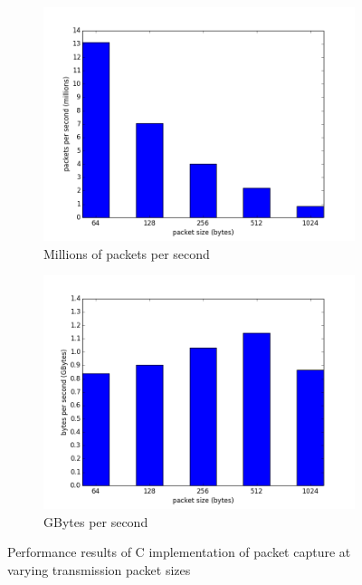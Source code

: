 \documentclass[final_report.tex]{subfiles}
\begin{document}
\begin{figure}[H]
	\centering
	\begin{subfigure}{0.5\textwidth}
		\includegraphics[width=\textwidth]{../../data/pktcap/packets.png}
		\caption{Millions of packets per second}
		\label{fig:pcpackets}
	\end{subfigure}%
	\begin{subfigure}{0.5\textwidth}
		\includegraphics[width=\textwidth]{../../data/pktcap/bytes.png}
		\caption{GBytes per second}
		\label{fig:pcbytes}
	\end{subfigure}
	\caption{Performance results of C implementation of packet capture at varying transmission packet sizes}
	\label{fig:pc}
\end{figure}
\end{document}
